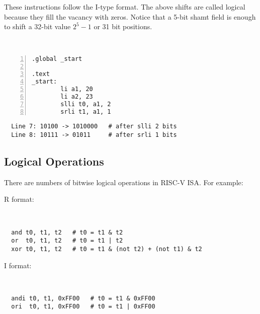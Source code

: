 These instructions follow the I-type format. The above shifts are called logical because they fill the vacancy with zeros. Notice that a 5-bit shamt field is enough to shift a 32-bit value  \(2^5 - 1\) or 31 bit positions. 

\begin{eg}~

\begin{minipage}{0.4\textwidth}
\begin{Verbatim}[numbers=left,xleftmargin=5mm]
.global _start

.text
_start:
        li a1, 20
        li a2, 23
        slli t0, a1, 2
        srli t1, a1, 1
\end{Verbatim}
\end{minipage}
\begin{minipage}{0.6\textwidth}
\color{red}
\begin{verbatim}
  Line 7: 10100 -> 1010000   # after slli 2 bits
  Line 8: 10111 -> 01011     # after srli 1 bits
\end{verbatim}
\end{minipage}
\end{eg}

\subsection{Logical Operations}
There are numbers of bitwise logical operations in RISC-V ISA. For example: 

R format: 
\begin{codeBlock}~
\begin{verbatim}
  and t0, t1, t2   # t0 = t1 & t2
  or  t0, t1, t2   # t0 = t1 | t2
  xor t0, t1, t2   # t0 = t1 & (not t2) + (not t1) & t2
\end{verbatim}
\end{codeBlock}

I format: 
\begin{codeBlock}~
\begin{verbatim}
  andi t0, t1, 0xFF00   # t0 = t1 & 0xFF00
  ori  t0, t1, 0xFF00   # t0 = t1 | 0xFF00
\end{verbatim}
\end{codeBlock}

